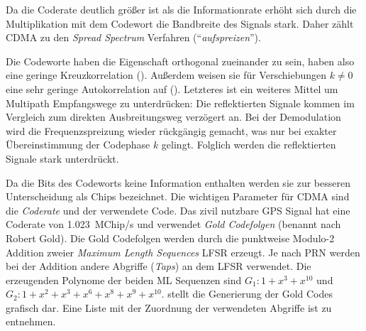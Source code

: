 Da die Coderate deutlich größer ist als die Informationrate erhöht sich durch die Multiplikation mit dem Codewort die Bandbreite des Signals stark. Daher zählt \gls{CDMA} zu den \emph{Spread Spectrum} Verfahren (\enquote{\emph{aufspreizen}}).

Die Codeworte haben die Eigenschaft orthogonal zueinander zu sein, haben also eine geringe Kreuzkorrelation (). Außerdem weisen sie für Verschiebungen $k\neq0$ eine sehr geringe Autokorrelation auf (). Letzteres ist ein weiteres Mittel um Multipath Empfangswege zu unterdrücken: Die reflektierten Signale kommen im Vergleich zum direkten Ausbreitungsweg verzögert an. Bei der Demodulation wird die Frequenzspreizung wieder rückgängig gemacht, was nur bei exakter Übereinstimmung der Codephase $k$ gelingt. Folglich werden die reflektierten Signale stark unterdrückt.



Da die Bits des Codeworts keine Information enthalten werden sie zur besseren Unterscheidung als \glspl{Chip} bezeichnet. Die wichtigen Parameter für CDMA sind die \emph{Coderate} und der verwendete Code. Das zivil nutzbare GPS Signal hat eine Coderate von \SI{1.023}{MChip/s} und verwendet \emph{Gold Codefolgen} (benannt nach Robert Gold). Die Gold Codefolgen werden durch die punktweise Modulo-2 Addition zweier \emph{Maximum Length Sequences} \gls{LFSR} erzeugt. Je nach \gls{PRN} werden bei der Addition andere Abgriffe (\emph{Taps}) an dem \gls{LFSR} verwendet. Die erzeugenden Polynome der beiden ML Sequenzen sind $G_1: 1 + x^3 + x^10$ und $G_2: 1 + x^2 + x^3 +x^6 + x^8 + x^9 + x^{10}$.  stellt die Generierung der Gold Codes grafisch dar. Eine Liste mit der Zuordnung der verwendeten Abgriffe ist \cite{specification2010gps} zu entnehmen.



